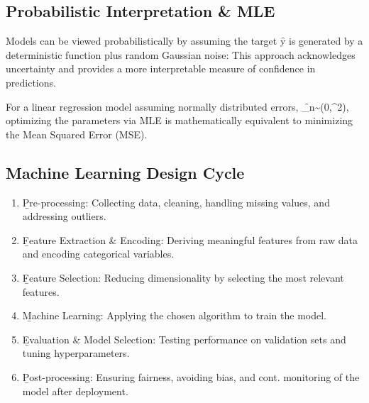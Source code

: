 

\subsection{Probabilistic Interpretation \& MLE}

Models can be viewed probabilistically by assuming the target \f{y} is generated by a deterministic function plus random Gaussian noise: 
This approach acknowledges uncertainty and provides a more interpretable measure of confidence in predictions.

\vspace{.5em}
For a linear regression model assuming normally distributed errors, \f{\epsilon_n\sim{}(0,\sigma^2)}, optimizing the parameters via MLE is mathematically equivalent to minimizing the Mean Squared Error (MSE).

\subsection{Machine Learning Design Cycle}
\vspace*{.5em}
\begin{center}
\end{center}
\vspace{.1cm}
\begin{enumerate}
\item \b{Pre-processing}: Collecting data, cleaning, handling missing values, and addressing outliers.
\item \b{Feature Extraction \& Encoding}: Deriving meaningful features from raw data and encoding categorical variables.
\item \b{Feature Selection}: Reducing dimensionality by selecting the most relevant features.
\item \b{Machine Learning}: Applying the chosen algorithm to train the model.
\item \b{Evaluation \& Model Selection}: Testing performance on validation sets and tuning hyperparameters.
\item \b{Post-processing}: Ensuring fairness, avoiding bias, and cont. monitoring of the model after deployment.
\end{enumerate}
\clearpage